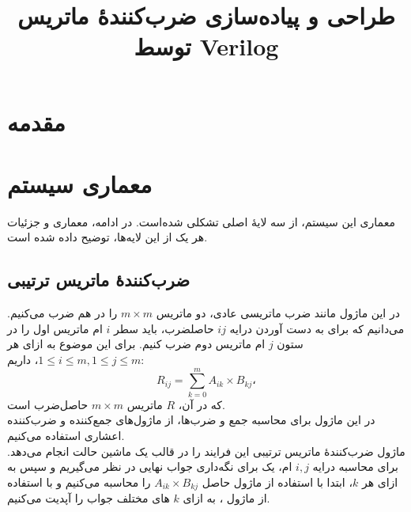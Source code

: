 \documentclass[conference]{IEEEtran-ModifiedForMVIP}
\begin{document}
\IEEEoverridecommandlockouts 

\title{
طراحی و پیاده‌سازی ضرب‌کنندهٔ ماتریس توسط Verilog
}

\author{
}

\maketitle
\begin{abstract}
\end{abstract}
\begin{IEEEkeywords}
\end{IEEEkeywords}


\section{مقدمه}


\section{معماری سیستم}

معماری این سیستم، از سه لایهٔ اصلی تشکلی شده‌است. در ادامه، معماری و جزئیات هر یک از این لایه‌ها، توضیح داده شده است.

\subsection{
    ضرب‌کنندهٔ ماتریس ترتیبی
}

در این ماژول مانند ضرب ماتریسی عادی، دو ماتریس 
$m \times m$
را در هم ضرب می‌کنیم. می‌دانیم که برای به دست آوردن درایه 
$ij$
حاصلضرب، باید سطر $i$ ام ماتریس اول را در ستون $j$ ام ماتریس دوم ضرب کنیم. برای این موضوع به ازای هر 
$1\leq i\leq m , 1\leq j\leq m $،
داریم:
$$R_{ij} = \sum_{k=0}^m{A_{ik} \times B_{kj}}،$$
که در آن،
$R$
ماتریس
$m \times m$
حاصل‌ضرب است.\\
در این ماژول برای محاسبه جمع و ضرب‌ها، از ماژول‌های جمع‌کننده و ضرب‌کننده اعشاری
 استفاده می‌کنیم.\\
ماژول ضرب‌کنندهٔ ماتریس ترتیبی
 این فرایند را در قالب یک ماشین حالت انجام می‌دهد. برای محاسبه درایه $i,j$ ام، یک 
 برای نگه‌داری جواب نهایی در نظر می‌گیریم و سپس
  به ازای هر $k$، ابتدا با استفاده از ماژول 
  حاصل
$A_{ik}\times B_{kj}$
 را محاسبه می‌کنیم و با استفاده از ماژول
 ، به ازای $k$ های مختلف جواب را آپدیت می‌کنیم.  
\end{document}
